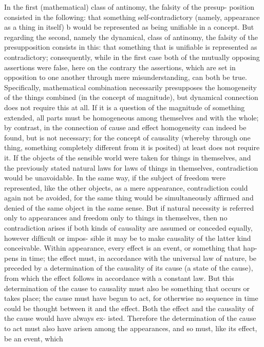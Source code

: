 In the ﬁrst (mathematical) class of antinomy, the falsity of the presup-
position consisted in the following: that something self-contradictory
(namely, appearance as a thing in itself) b would be represented as being
uniﬁable in a concept. But regarding the second, namely the dynamical,
class of antinomy, the falsity of the presupposition consists in this: that
something that is uniﬁable is represented as contradictory; consequently,
while in the ﬁrst case both of the mutually opposing assertions were false,
here on the contrary the assertions, which are set in opposition to one
another through mere misunderstanding, can both be true.
Speciﬁcally, mathematical combination necessarily presupposes the
homogeneity of the things combined (in the concept of magnitude), but
dynamical connection does not require this at all. If it is a question of
the magnitude of something extended, all parts must be homogeneous
among themselves and with the whole; by contrast, in the connection of
cause and effect homogeneity can indeed be found, but is not necessary;
for the concept of causality (whereby through one thing, something
completely different from it is posited) at least does not require it.
If the objects of the sensible world were taken for things in themselves,
and the previously stated natural laws for laws of things in themselves,
contradiction would be unavoidable. In the same way, if the subject of
freedom were represented, like the other objects, as a mere appearance,
contradiction could again not be avoided, for the same thing would be
simultaneously afﬁrmed and denied of the same object in the same sense.
But if natural necessity is referred only to appearances and freedom only
to things in themselves, then no contradiction arises if both kinds of
causality are assumed or conceded equally, however difﬁcult or impos-
sible it may be to make causality of the latter kind conceivable.
Within appearance, every effect is an event, or something that hap-
pens in time; the effect must, in accordance with the universal law of
nature, be preceded by a determination of the causality of its cause (a
state of the cause), from which the effect follows in accordance with a
constant law. But this determination of the cause to causality must also
be something that occurs or takes place; the cause must have begun to act,
for otherwise no sequence in time could be thought between it and the
effect. Both the effect and the causality of the cause would have always ex-
isted. Therefore the determination of the cause to act must also have arisen
among the appearances, and so must, like its effect, be an event, which
